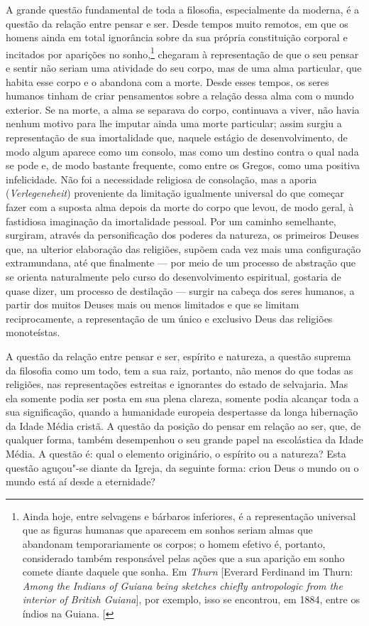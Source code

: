 A grande questão fundamental de toda a filosofia, especialmente da
moderna, é a questão da relação entre pensar e ser. Desde tempos muito
remotos, em que os homens ainda em total ignorância sobre da sua própria
constituição corporal e incitados por aparições no sonho,\footnote{Ainda hoje, entre selvagens e bárbaros inferiores, é a representação
  universal que as figuras humanas que aparecem em sonhos seriam almas
  que abandonam temporariamente os corpos; o homem efetivo é, portanto,
  considerado também responsável pelas ações que a sua aparição em sonho
  comete diante daquele que sonha. Em \emph{Thurn} {[}Everard Ferdinand
  im Thurn: \emph{Among the Indians of Guiana being sketches chiefly
  antropologic from the interior of British Guiana}{]}, por exemplo,
  isso se encontrou, em 1884, entre os índios na Guiana. {[}\versal{N.\,E.}{]}}
chegaram à representação de que o seu pensar e sentir não seriam uma
atividade do seu corpo, mas de uma alma particular, que habita esse
corpo e o abandona com a morte. Desde esses tempos, os seres humanos
tinham de criar pensamentos sobre a relação dessa alma com o mundo
exterior. Se na morte, a alma se separava do corpo, continuava a viver,
não havia nenhum motivo para lhe imputar ainda uma morte particular;
assim surgiu a representação de sua imortalidade que, naquele estágio de
desenvolvimento, de modo algum aparece como um consolo, mas como um
destino contra o qual nada se pode e, de modo bastante frequente, como
entre os Gregos, como uma positiva infelicidade. Não foi a necessidade
religiosa de consolação, mas a aporia (\emph{Verlegeneheit}) proveniente
da limitação igualmente universal do que começar fazer com a suposta
alma depois da morte do corpo que levou, de modo geral, à fastidiosa
imaginação da imortalidade pessoal. Por um caminho semelhante, surgiram,
através da personificação dos poderes da natureza, os primeiros Deuses
que, na ulterior elaboração das religiões, supõem cada vez mais uma
configuração extramundana, até que finalmente --- por meio de um processo
de abstração que se orienta naturalmente pelo curso do desenvolvimento
espiritual, gostaria de quase dizer, um processo de destilação --- surgir
na cabeça dos seres humanos, a partir dos muitos Deuses mais ou menos
limitados e que se limitam reciprocamente, a representação de um único e
exclusivo Deus das religiões monoteístas.

A questão da relação entre pensar e ser, espírito e natureza, a questão
suprema da filosofia como um todo, tem a sua raiz, portanto, não menos
do que todas as religiões, nas representações estreitas e ignorantes do
estado de selvajaria. Mas ela somente podia ser posta em sua plena
clareza, somente podia alcançar toda a sua significação, quando a
humanidade europeia despertasse da longa hibernação da Idade Média
cristã. A questão da posição do pensar em relação ao ser, que, de
qualquer forma, também desempenhou o seu grande papel na escolástica da
Idade Média. A questão é: qual o elemento originário, o espírito ou a
natureza? Esta questão aguçou"-se diante da Igreja, da seguinte forma:
criou Deus o mundo ou o mundo está aí desde a eternidade?

